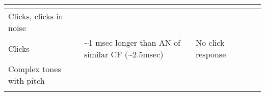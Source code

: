 \begin{longtable}{XXXXXX}
                      \citep{ClockSalviEtAl:1993}                       &                                                                          & & & \\\hline
                        Clicks, clicks in noise                         & 
                      \citep{BurkardPalmer:1997}                        &                                                                          & & & \\\hline
                                Clicks                                  &                                                                          & \~{}1 msec longer
      than AN of similar CF (\~{}2.5msec) \citep{JorisSmith:1998}       & No click
response
 \citep{GodfreyKiangEtAl:1975,GodfreyKiangEtAl:1975a,JorisSmith:1998}   &                                                                          & 
\\\hline
                       Complex tones with pitch                         & 

                     \citep{WinterPalmerEtAl:2003}                      &                                                                          & & & \\\hline
                                                                        &                                                                          & & & & \\\hline
\end{longtable}

